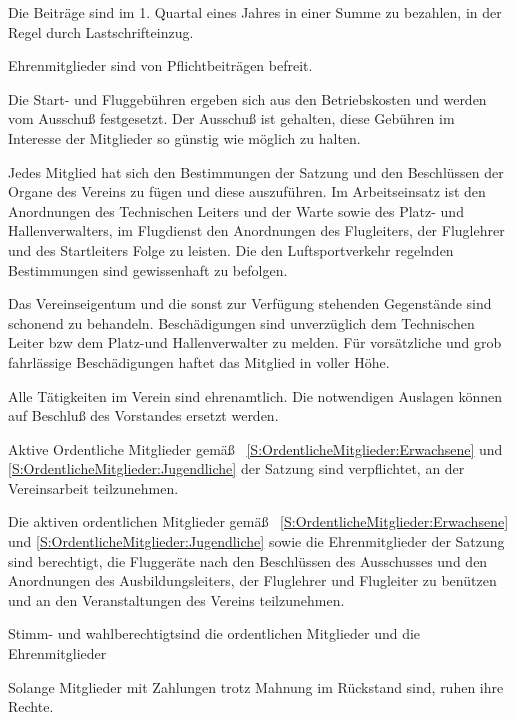 \documentclass[10pt,a4paper,parskip=half]{scrartcl}
\begin{document}
\begin{contract}
\begin{multicols}{2}
    Die Beiträge sind im 1. Quartal eines Jahres in einer Summe zu bezahlen,
    in der Regel durch Lastschrifteinzug.
    
    Ehrenmitglieder sind von Pflichtbeiträgen befreit.
    
    Die Start- und Fluggebühren ergeben sich aus den Betriebskosten und werden vom Ausschuß festgesetzt.
    Der Ausschuß ist gehalten,
    diese Gebühren im Interesse der Mitglieder so günstig wie möglich zu halten.
    
    
    Jedes Mitglied hat sich den Bestimmungen der Satzung und den Beschlüssen der Organe des Vereins zu fügen und diese auszuführen.
    Im Arbeitseinsatz ist den Anordnungen des Technischen Leiters und der Warte sowie des Platz- und Hallenverwalters,
    im Flugdienst den Anordnungen des Flugleiters,
    der Fluglehrer und des Startleiters Folge zu leisten.
    Die den Luftsportverkehr regelnden Bestimmungen sind gewissenhaft zu befolgen.
    
    Das Vereinseigentum und die sonst zur Verfügung stehenden Gegenstände sind schonend zu behandeln.
    Beschädigungen sind unverzüglich dem Technischen Leiter bzw dem Platz-und Hallenverwalter zu melden.
    Für vorsätzliche und grob fahrlässige Beschädigungen haftet das Mitglied in voller Höhe.
    
    Alle Tätigkeiten im Verein sind ehrenamtlich.
    Die notwendigen Auslagen können auf Beschluß des Vorstandes ersetzt werden.
    
    Aktive Ordentliche Mitglieder gemäß ~\autoref{S:OrdentlicheMitglieder:Erwachsene} und \autoref{S:OrdentlicheMitglieder:Jugendliche} der Satzung sind verpflichtet,
    an der Vereinsarbeit teilzunehmen.
    
    
    Die aktiven ordentlichen Mitglieder gemäß ~\autoref{S:OrdentlicheMitglieder:Erwachsene} und \autoref{S:OrdentlicheMitglieder:Jugendliche}
    sowie die Ehrenmitglieder der Satzung sind berechtigt,
    die Fluggeräte nach den Beschlüssen des Ausschusses und den Anordnungen des Ausbildungsleiters,
    der Fluglehrer und Flugleiter zu benützen und an den Veranstaltungen des Vereins teilzunehmen.
    
    Stimm- und wahlberechtigtsind die ordentlichen Mitglieder und die Ehrenmitglieder
    
    Solange Mitglieder mit Zahlungen trotz Mahnung im Rückstand sind,
    ruhen ihre Rechte.
    

\end{multicols}
\end{contract}
\end{document}
